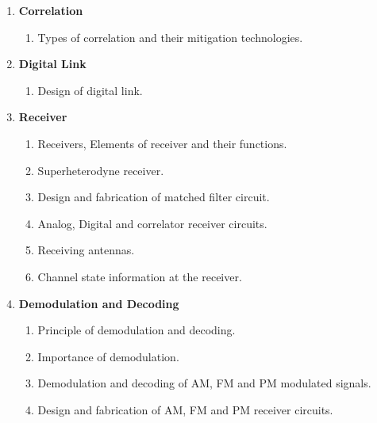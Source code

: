 \documentclass[12pt, a4paper]{article}
\newcommand{\hl}[1]{\colorbox{lgreen}{#1}}
\begin{document}
\begin{enumerate}
		\item \textbf{Correlation}
		\begin{enumerate}[label*=\arabic*.]
			\item \hl{Types of correlation and their mitigation technologies.}
		\end{enumerate}
		
		\item \textbf{Digital Link}
		\begin{enumerate}[label*=\arabic*.]
			\item Design of digital link.
		\end{enumerate}
		
		\item \textbf{Receiver}
		\begin{enumerate}[label*=\arabic*.]
			\item \hl{Receivers, Elements of receiver and their functions.}
			\item \hl{Superheterodyne receiver.}
			\item Design and fabrication of matched filter circuit.
			\item \hl{Analog, Digital and correlator receiver circuits.}
			\item Receiving antennas.
			\item Channel state information at the receiver.
		\end{enumerate}
		
		\item \textbf{Demodulation and Decoding}
		\begin{enumerate}[label*=\arabic*.]
			\item \hl{Principle of demodulation and decoding.}
			\item \hl{Importance of demodulation.}
			\item \hl{Demodulation and decoding of AM, FM and PM modulated signals.}
			\item \hl{Design and fabrication of AM, FM and PM receiver circuits.}
		\end{enumerate}
		
	\end{enumerate}
	
	\newpage
\end{document}
